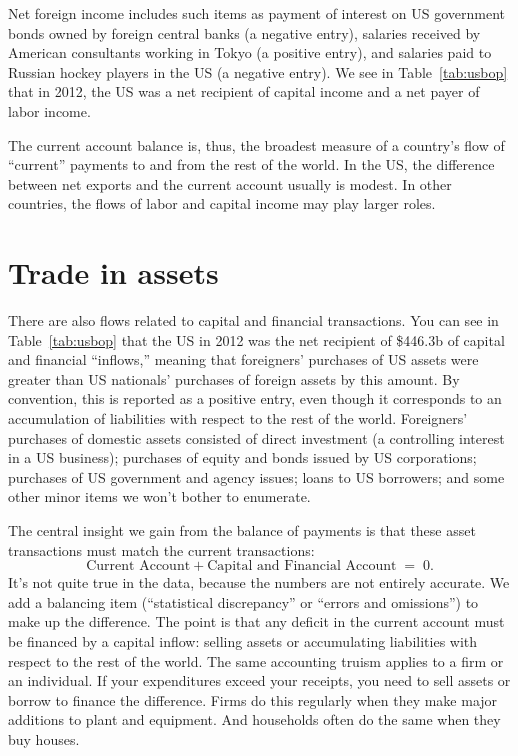 Net foreign income includes such items as payment of interest
on US government bonds owned by foreign central banks  (a negative entry),
salaries received by American consultants working in Tokyo
(a positive entry),
and salaries paid to Russian hockey players in the US
(a negative entry).
We see in Table~\ref{tab:usbop} that in 2012,
the US was a net recipient of capital income and a net payer
of labor income.


The current account balance is, thus, the broadest measure of a country's flow
of ``current'' payments to and from the rest of the world. In the
US, the difference between net exports and the current
account usually is modest. In other countries, the flows
of labor and capital income may play larger roles.



\section{Trade in assets}

There are also flows related to capital and financial
transactions.
You can see in Table~\ref{tab:usbop} that the US in 2012 was the net recipient of
\$446.3b of capital and financial ``inflows,'' meaning that
foreigners' purchases of US assets were greater than US nationals'
purchases of foreign assets by this amount.
By convention, this is reported as a
positive entry, even though it corresponds to an accumulation of
liabilities with respect to the rest of the world.  Foreigners' purchases
of domestic assets consisted of direct investment (a controlling
interest in a US business); purchases of equity and bonds issued by
US corporations; purchases of US government and agency issues; loans to US borrowers; and
some other minor items we won't bother to enumerate.

The central insight we gain from the balance of payments
is that these asset transactions must match the current transactions:
\[
    \mbox{Current Account} + \mbox{Capital and Financial Account} \;=\; 0.
\]
It's not quite true in the data, because the numbers are not
entirely accurate.
We add a balancing item
(``statistical discrepancy'' or ``errors and omissions'') to make up the
difference. The point is that any deficit in the current account
must be financed by a capital inflow:
selling assets or accumulating liabilities with
respect to the rest of the world.  The same accounting
 truism applies to a firm or an individual.  If your expenditures exceed
your receipts, you need to sell assets or borrow to finance the
difference. Firms do this regularly when they make major additions
to plant and equipment. And households often do the same when they
buy houses.

